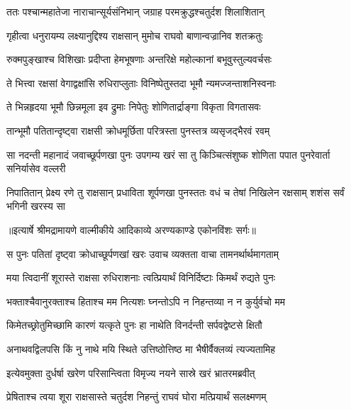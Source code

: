 \twolineshloka
{ततः पश्चान्महातेजा नाराचान्सूर्यसंनिभान्}
{जग्राह परमक्रुद्धश्चतुर्दश शिलाशितान्} %

\twolineshloka
{गृहीत्वा धनुरायम्य लक्ष्यानुद्दिश्य राक्षसान्}
{मुमोच राघवो बाणान्वज्रानिव शतक्रतुः} %

\twolineshloka
{रुक्मपुङ्खाश्च विशिखाः प्रदीप्ता हेमभूषणाः}
{अन्तरिक्षे महोल्कानां बभूवुस्तुल्यवर्चसः} %

\twolineshloka
{ते भित्त्वा रक्षसां वेगाद्वक्षांसि रुधिराप्लुताः}
{विनिष्पेतुस्तदा भूमौ न्यमज्जन्ताशनिस्वनाः} %

\twolineshloka
{ते भिन्नहृदया भूमौ छिन्नमूला इव द्रुमाः}
{निपेतुः शोणितार्द्राङ्गा विकृता विगतासवः} %

\twolineshloka
{तान्भूमौ पतितान्दृष्ट्वा राक्षसी क्रोधमूर्छिता}
{परित्रस्ता पुनस्तत्र व्यसृजद्भैरवं रवम्} %

\threelineshloka
{सा नदन्ती महानादं जवाच्छूर्पणखा पुनः}
{उपगम्य खरं सा तु किञ्चित्संशुष्क शोणिता}
{पपात पुनरेवार्ता सनिर्यासेव वल्लरी} %

\fourlineindentedshloka
{निपातितान् प्रेक्ष्य रणे तु राक्षसान्}
{प्रधाविता शूर्पणखा पुनस्ततः}
{वधं च तेषां निखिलेन रक्षसाम्}
{शशंस सर्वं भगिनी खरस्य सा} %


{॥इत्यार्षे श्रीमद्रामायणे वाल्मीकीये आदिकाव्ये अरण्यकाण्डे एकोनविंशः सर्गः॥}


\twolineshloka
{स पुनः पतितां दृष्ट्वा क्रोधाच्छूर्पणखां खरः}
{उवाच व्यक्तता वाचा तामनर्थार्थमागताम्} %

\twolineshloka
{मया त्विदानीं शूरास्ते राक्षसा रुधिराशनाः}
{त्वत्प्रियार्थं विनिर्दिष्टाः किमर्थं रुद्यते पुनः} %

\twolineshloka
{भक्ताश्चैवानुरक्ताश्च हिताश्च मम नित्यशः}
{घ्नन्तोऽपि न निहन्तव्या न न कुर्युर्वचो मम} %

\twolineshloka
{किमेतच्छ्रोतुमिच्छामि कारणं यत्कृते पुनः}
{हा नाथेति विनर्दन्ती सर्पवद्वेष्टसे क्षितौ} %

\twolineshloka
{अनाथवद्विलपसि किं नु नाथे मयि स्थिते}
{उत्तिष्ठोत्तिष्ठ मा भैषीर्वैक्लव्यं त्यज्यतामिह} %

\twolineshloka
{इत्येवमुक्ता दुर्धर्षा खरेण परिसान्त्विता}
{विमृज्य नयने सास्रे खरं भ्रातरमब्रवीत्} %

\twolineshloka
{प्रेषिताश्च त्वया शूरा राक्षसास्ते चतुर्दश}
{निहन्तुं राघवं घोरा मत्प्रियार्थं सलक्ष्मणम्} %

